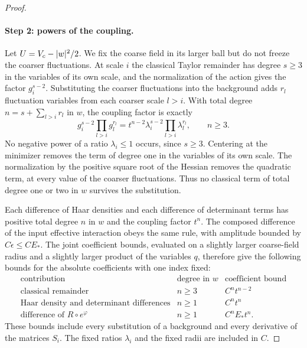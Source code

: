 \begin{proof}
\paragraph{Step 2: powers of the coupling.}
Let $U=V_c-\lvert w\rvert^2/2$. We fix the coarse field in its larger ball but do not freeze the coarser fluctuations. At scale $i$ the classical Taylor remainder has degree $s\ge3$ in the variables of its own scale, and the normalization of the action gives the factor $g_i^{s-2}$. Substituting the coarser fluctuations into the background adds $r_l$ fluctuation variables from each coarser scale $l>i$. With total degree $n=s+\sum_{l>i}r_l$ in $w$, the coupling factor is exactly
\begin{equation}\label{ch10:eq:classical-free-powers}
 g_i^{s-2}\prod_{l>i}g_l^{r_l}=t^{n-2}\lambda_i^{s-2}\prod_{l>i}\lambda_l^{r_l},\qquad n\ge3.
\end{equation}
No negative power of a ratio $\lambda_i\le1$ occurs, since $s\ge3$. Centering at the minimizer removes the term of degree one in the variables of its own scale. The normalization by the positive square root of the Hessian removes the quadratic term, at every value of the coarser fluctuations. Thus no classical term of total degree one or two in $w$ survives the substitution.

Each difference of Haar densities and each difference of determinant terms has positive total degree $n$ in $w$ and the coupling factor $t^n$. The composed difference of the input effective interaction obeys the same rule, with amplitude bounded by $C\epsilon\le CE_*$. The joint coefficient bounds, evaluated on a slightly larger coarse-field radius and a slightly larger product of the variables $q$, therefore give the following bounds for the absolute coefficients with one index fixed:
\begin{equation}\label{ch10:eq:free-coefficient-rules}
 \begin{array}{l|c|c}
 \text{contribution}&\text{degree in }w&\text{coefficient bound}\\ \hline
 \text{classical remainder}&n\ge3&C^nt^{n-2}\\
 \text{Haar density and determinant differences}&n\ge1&C^nt^n\\
 \text{difference of }R\circ e^{\varphi}&n\ge1&C^nE_*t^n.
 \end{array}
\end{equation}
These bounds include every substitution of a background and every derivative of the matrices $S_i$. The fixed ratios $\lambda_i$ and the fixed radii are included in $C$.


\end{proof}
